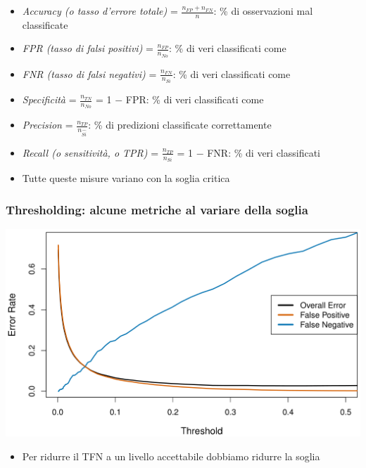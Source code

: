 \begin{frame}
\begin{scriptsize}
	
	\begin{itemize}
		\item \emph{Accuracy (o tasso d'errore totale)} = ${\displaystyle \frac{n_{FP}+n_{FN}}{n}}$: \% di osservazioni mal classificate
		\item \emph{FPR (tasso di falsi positivi)} = ${\displaystyle \frac{n_{FP}}{n_{No}}}$: \% di veri   classificati come 
		\item \emph{FNR (tasso di falsi negativi)} = ${\displaystyle \frac{n_{FN}}{n_{Si}}}$: \% di veri  classificati come 
		\item \emph{Specificità} = ${\displaystyle \frac{n_{TN}}{n_{No}}}$ = 1 $-$ FPR: \% di veri   classificati come 	
		\item \emph{Precision} = ${\displaystyle \frac{n_{TP}}{n_{\widehat{Si}}}}$: \% di predizioni  classificate correttamente
		\item \emph{Recall (o sensitività, o TPR)} = ${\displaystyle \frac{n_{TP}}{n_{Si}}}$ = 1 $-$ FNR: \% di veri  classificati 
		\item Tutte queste misure variano con la soglia critica
	\end{itemize}
	
	\end{scriptsize}
\end{frame}


\begin{frame}
	\frametitle{Thresholding: alcune metriche al variare della soglia}
	
	\begin{center}
		\includegraphics[scale=0.35]{images/supervised/z_algoritms_logistic_thresholding/thresholding_errors.png}
	\end{center}
	
	\begin{itemize}
		\item Per ridurre il TFN a un livello accettabile dobbiamo ridurre la soglia
	\end{itemize}
\end{frame}


